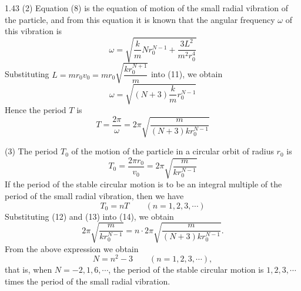 \begin{solution}{1.43}
(2) Equation (8) is the equation of motion of the small radial vibration of the particle, and from this equation it is known that the angular frequency $\omega$ of this vibration is
\begin{equation}
\omega=\sqrt{\frac{k}{m}Nr_0^{N-1}+\frac{3L^2}{m^2r_0^4}} \tag{11}
\end{equation}
Substituting $L=mr_0v_0=mr_0\sqrt{\dfrac{kr_0^{N+1}}{m}}$ into (11), we obtain
\begin{equation}
\omega=\sqrt{(N+3)\frac{k}{m}r_0^{N-1}} \tag{12}
\end{equation}
Hence the period $T$ is
\begin{equation}
T=\frac{2\pi}{\omega}=2\pi\sqrt{\frac{m}{(N+3)kr_0^{N-1}}} \tag{12}
\end{equation}

(3) The period $T_0$ of the motion of the particle in a circular orbit of radius $r_0$ is
\begin{equation}
T_0=\frac{2\pi r_0}{v_0}=2\pi\sqrt{\frac{m}{kr_0^{N-1}}} \tag{13}
\end{equation}
If the period of the stable circular motion is to be an integral multiple of the period of the small radial vibration, then we have
\begin{equation}
T_0=nT\qquad(n=1,2,3,\cdots) \tag{14}
\end{equation}
Substituting (12) and (13) into (14), we obtain
\[
2\pi\sqrt{\frac{m}{kr_0^{N-1}}}=n\cdot2\pi\sqrt{\frac{m}{(N+3)kr_0^{N-1}}}.
\]
From the above expression we obtain
\[
N=n^2-3\qquad(n=1,2,3,\cdots),
\]
that is, when $N=-2,1,6,\cdots$, the period of the stable circular motion is $1,2,3,\cdots$ times the period of the small radial vibration.
\end{solution}

